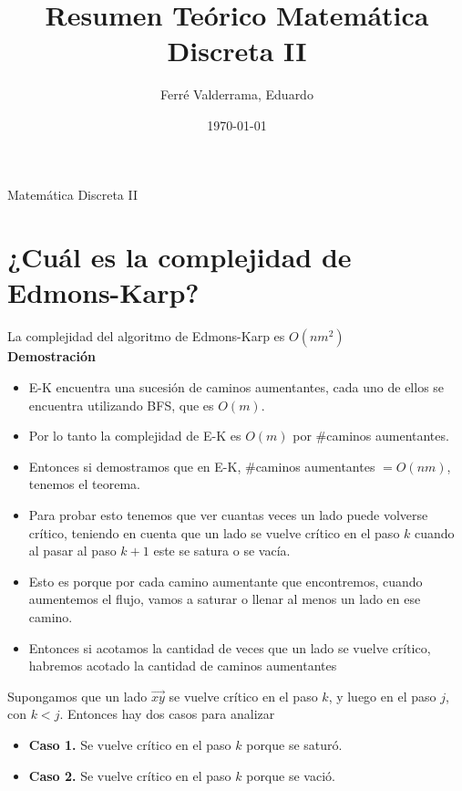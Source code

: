 \documentclass[11pt, a4paper]{article}
\title{Resumen Teórico Matemática Discreta II}
\author{Ferré Valderrama, Eduardo}
\date{\today}
\theoremstyle{definition}
\begin{document}
\maketitle
Matemática Discreta II
\tableofcontents

\section{¿Cuál es la complejidad de Edmons-Karp?}

La complejidad del algoritmo de Edmons-Karp es $O(nm^2)$\\
\textbf{Demostración}
    \begin{itemize}
        \item E-K encuentra una sucesión de caminos aumentantes, cada uno de ellos se encuentra utilizando BFS, que es $O(m)$.
        \item Por lo tanto la complejidad de E-K es $O(m)$ por $\#$caminos aumentantes.
        \item Entonces si demostramos que en E-K, $\#$caminos aumentantes  $= O(nm)$, tenemos el teorema.
        \item Para probar esto tenemos que ver cuantas veces un lado puede volverse crítico, teniendo en cuenta que un lado se vuelve crítico en el paso $k$ cuando al pasar al paso $k+1$ este se satura o se vacía.
        \item Esto es porque por cada camino aumentante que encontremos, cuando aumentemos el flujo, vamos a saturar o llenar al menos un lado en ese camino.
        \item Entonces si acotamos la cantidad de veces que un lado se vuelve crítico, habremos acotado la cantidad de caminos aumentantes
    \end{itemize}
    Supongamos que un lado $\overrightarrow{xy}$ se vuelve crítico en el paso $k$, y luego en el paso $j$, con $k<j$. Entonces hay dos casos para analizar
    \begin{itemize}
        \item \textbf{Caso 1.} Se vuelve crítico en el paso $k$ porque se saturó.
        \item \textbf{Caso 2.} Se vuelve crítico en el paso $k$ porque se vació.
    \end{itemize}
    
\end{document}
